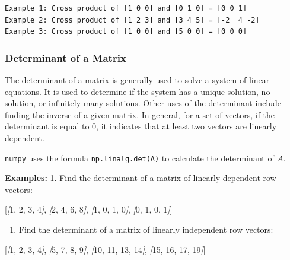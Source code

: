 \documentclass[11pt]{article}
\providecommand{\tightlist}{%
      \setlength{\itemsep}{0pt}\setlength{\parskip}{0pt}}
\newenvironment{Shaded}{}{}
\newcommand{\CommentTok}[1]{\textcolor[rgb]{0.38,0.63,0.69}{\textit{{#1}}}}
\newcommand{\OtherTok}[1]{\textcolor[rgb]{0.00,0.44,0.13}{{#1}}}
\newcommand{\NormalTok}[1]{{#1}}
\begin{document}
    \begin{Verbatim}[commandchars=\\\{\}]
Example 1: Cross product of [1 0 0] and [0 1 0] = [0 0 1]
Example 2: Cross product of [1 2 3] and [3 4 5] = [-2  4 -2]
Example 3: Cross product of [1 0 0] and [5 0 0] = [0 0 0]
    \end{Verbatim}

    \newpage

\subsubsection{Determinant of a Matrix}\label{determinant-of-a-matrix}

The determinant of a matrix is generally used to solve a system of
linear equations. It is used to determine if the system has a unique
solution, no solution, or infinitely many solutions. Other uses of the
determinant include finding the inverse of a given matrix. In general,
for a set of vectors, if the determinant is equal to 0, it indicates
that at least two vectors are linearly dependent.

\texttt{numpy} uses the formula \texttt{np.linalg.det(A)} to calculate
the determinant of \(A\).

\textbf{Examples:} 1. Find the determinant of a matrix of linearly
dependent row vectors:

\begin{Shaded}
\begin{Highlighting}[]
\NormalTok{[}\CommentTok{[}\OtherTok{1, 2, 3, 4}\CommentTok{]}\NormalTok{,}
 \CommentTok{[}\OtherTok{2, 4, 6, 8}\CommentTok{]}\NormalTok{,}
 \CommentTok{[}\OtherTok{1, 0, 1, 0}\CommentTok{]}\NormalTok{,}
 \CommentTok{[}\OtherTok{0, 1, 0, 1}\CommentTok{]}\NormalTok{]}
\end{Highlighting}
\end{Shaded}

\begin{enumerate}
\def\labelenumi{\arabic{enumi}.}
\setcounter{enumi}{1}
\tightlist
\item
  Find the determinant of a matrix of linearly independent row vectors:
\end{enumerate}

\begin{Shaded}
\begin{Highlighting}[]
\NormalTok{[}\CommentTok{[}\OtherTok{1, 2, 3, 4}\CommentTok{]}\NormalTok{,}
 \CommentTok{[}\OtherTok{5, 7, 8, 9}\CommentTok{]}\NormalTok{,}
 \CommentTok{[}\OtherTok{10, 11, 13, 14}\CommentTok{]}\NormalTok{,}
 \CommentTok{[}\OtherTok{15, 16, 17, 19}\CommentTok{]}\NormalTok{]}
\end{Highlighting}
\end{Shaded}
\end{document}
